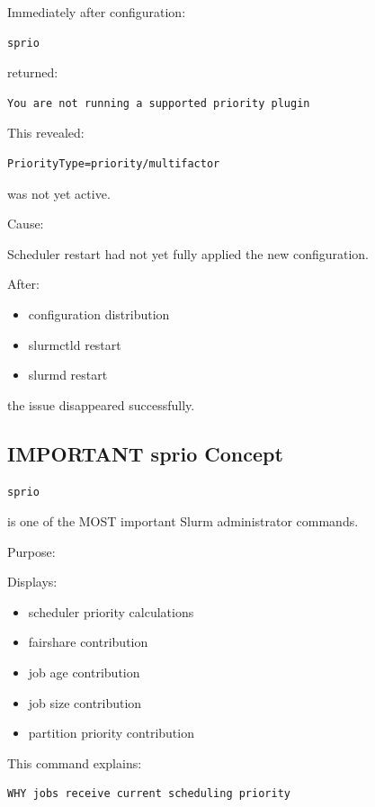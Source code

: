 \documentclass[11pt]{article}
\begin{document}
Immediately after configuration:

\begin{verbatim}
sprio
\end{verbatim}

returned:

\begin{verbatim}
You are not running a supported priority plugin
\end{verbatim}

This revealed:

\begin{verbatim}
PriorityType=priority/multifactor
\end{verbatim}

was not yet active.

Cause:

Scheduler restart had not yet fully applied the new configuration.

After:

\begin{itemize}
\item configuration distribution
\item slurmctld restart
\item slurmd restart
\end{itemize}

the issue disappeared successfully.
\subsection{IMPORTANT sprio Concept}
\label{sec:org76af162}

\begin{verbatim}
sprio
\end{verbatim}

is one of the MOST important Slurm administrator commands.

Purpose:

Displays:

\begin{itemize}
\item scheduler priority calculations
\item fairshare contribution
\item job age contribution
\item job size contribution
\item partition priority contribution
\end{itemize}

This command explains:

\begin{verbatim}
WHY jobs receive current scheduling priority
\end{verbatim}
\end{document}

